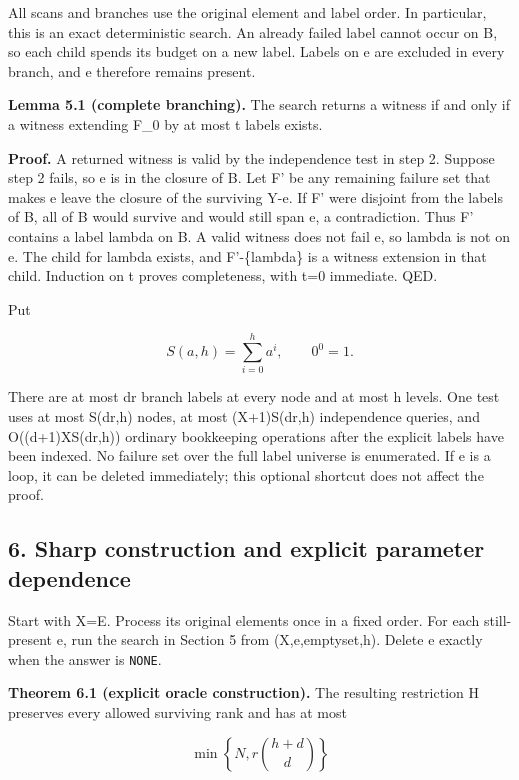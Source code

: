 All scans and branches use the original element and label order. In particular, this is an exact deterministic search. An already failed label cannot occur on B, so each child spends its budget on a new label. Labels on e are excluded in every branch, and e therefore remains present.

\textbf{Lemma 5.1 (complete branching).} The search returns a witness if and only if a witness extending F\_0 by at most t labels exists.

\textbf{Proof.} A returned witness is valid by the independence test in step 2. Suppose step 2 fails, so e is in the closure of B. Let F' be any remaining failure set that makes e leave the closure of the surviving Y-e. If F' were disjoint from the labels of B, all of B would survive and would still span e, a contradiction. Thus F' contains a label lambda on B. A valid witness does not fail e, so lambda is not on e. The child for lambda exists, and F'-\{lambda\} is a witness extension in that child. Induction on t proves completeness, with t=0 immediate. QED.

Put

\[
S(a,h)=\sum_{i=0}^{h}a^i,
\qquad 0^0=1.
\]

There are at most dr branch labels at every node and at most h levels. One test uses at most S(dr,h) nodes, at most (\textbar X\textbar+1)S(dr,h) independence queries, and O((d+1)\textbar X\textbar S(dr,h)) ordinary bookkeeping operations after the explicit labels have been indexed. No failure set over the full label universe is enumerated. If e is a loop, it can be deleted immediately; this optional shortcut does not affect the proof.

\hypertarget{af-4c0863a692-sharp-construction-and-explicit-parameter-dependence}{%
\subsection{6. Sharp construction and explicit parameter dependence}\label{af-4c0863a692-sharp-construction-and-explicit-parameter-dependence}}

Start with X=E. Process its original elements once in a fixed order. For each still-present e, run the search in Section 5 from (X,e,emptyset,h). Delete e exactly when the answer is \texttt{NONE}.

\textbf{Theorem 6.1 (explicit oracle construction).} The resulting restriction H preserves every allowed surviving rank and has at most

\[
\min\left\{N,r\binom{h+d}{d}\right\}
\]

